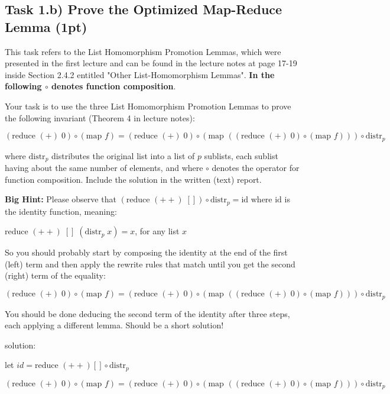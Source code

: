 \documentclass{article}
\begin{document}
\subsection{Task 1.b) Prove the Optimized Map-Reduce Lemma (1pt)}

This task refers to the List Homomorphism Promotion Lemmas, which were presented in the first lecture and can be found in the lecture notes at page 17-19 inside Section 2.4.2 entitled "Other List-Homomorphism Lemmas".   \textbf{In the following $\circ$ denotes function composition}.

Your task is to use the three List Homomorphism Promotion Lemmas to prove the following invariant (Theorem 4 in lecture notes):

\begin{equation*}
(\text{reduce } (+) \; 0) \circ (\text{map } f) = (\text{reduce } (+) \; 0) \circ (\text{map } ( (\text{reduce } (+) \; 0) \circ (\text{map } f) ) ) \circ \text{distr}_p
\end{equation*}

where $\text{distr}_p$  distributes the original list into a list of $p$ sublists, each sublist having about the same number of elements, and where $\circ$ denotes the operator for function composition.   Include the solution in the written (text) report. 

\textbf{Big Hint:} Please observe that  $(\text{reduce } (++) \; []) \circ \text{distr}_p = \text{id}$ where $\text{id}$ is the identity function, meaning:

$\text{reduce } (++) \; [] \; (\text{distr}_p \; x) = x$, for any list $x$

So you should probably start by composing the identity at the end of the first (left) term and then apply the rewrite rules that match until you get the second (right) term of the equality:

$(\text{reduce } (+) \; 0) \circ (\text{map } f) = (\text{reduce } (+) \; 0) \circ (\text{map } ( (\text{reduce } (+) \; 0) \circ (\text{map } f) ) ) \circ \text{distr}_p$

You should be done deducing the second term of the identity after three steps, each applying a different lemma. Should be a short solution!

solution:


let $id = \text{reduce } (++)[] \circ \text{distr}_p$

$(\text{reduce } (+) \; 0) \circ (\text{map } f) = (\text{reduce } (+) \; 0) \circ (\text{map } ( (\text{reduce } (+) \; 0) \circ (\text{map } f) ) ) \circ \text{distr}_p$
\end{document}
